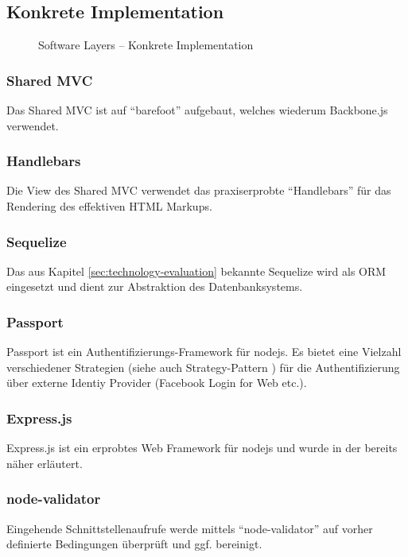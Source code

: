 \subsection*{Konkrete Implementation}

\begin{figure}[H]
	\centering{
		
	}

	\caption{Software Layers -- Konkrete Implementation}
\end{figure}

\subsubsection*{Shared MVC}
Das Shared MVC ist auf ``barefoot'' \cite{Barefoot} aufgebaut, welches wiederum Backbone.js \cite{Backbonejs} verwendet.

\subsubsection*{Handlebars}
Die View des Shared MVC verwendet das praxiserprobte ``Handlebars'' \cite{Handlebars} für das Rendering des effektiven HTML Markups.

\subsubsection*{Sequelize}
Das aus Kapitel \ref{sec:technology-evaluation}  bekannte Sequelize \cite{Sequelize} wird als ORM eingesetzt und dient zur Abstraktion des Datenbanksystems.

\subsubsection*{Passport}
Passport \cite{Passportjs} ist ein Authentifizierungs-Framework für \gls{nodejs}. Es bietet eine Vielzahl verschiedener Strategien (siehe auch Strategy-Pattern \cite{StrategyPattern}) für die Authentifizierung über externe Identiy Provider (Facebook Login for Web \cite{facebooklogin} etc.).

\subsubsection*{Express.js}
Express.js \cite{Expressjs} ist ein erprobtes Web Framework für \gls{nodejs} und wurde in der  bereits näher erläutert.

\subsubsection*{node-validator}
Eingehende Schnittstellenaufrufe werde mittels ``node-validator'' \cite{nodevalidator} auf vorher definierte Bedingungen überprüft und ggf. bereinigt.

